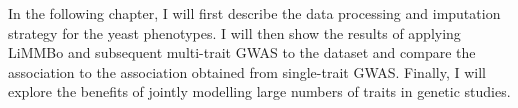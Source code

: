 In the following chapter, I will first describe the data processing and imputation strategy for the yeast phenotypes. I will then show the results of applying LiMMBo and subsequent multi-trait GWAS to the dataset and compare the association to the association obtained from single-trait GWAS. Finally, I will explore the benefits of jointly modelling large numbers of traits in genetic studies.
